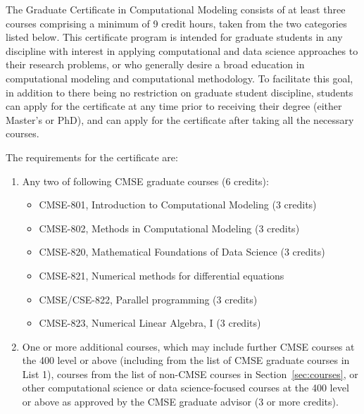 The Graduate Certificate in Computational Modeling consists of at least
three courses comprising a minimum of 9 credit hours, taken from the
two categories listed below.  This certificate program is intended for
graduate students in any discipline with interest in applying
computational and data science approaches to their research problems,
or who generally desire a broad education in computational modeling
and computational methodology.  To facilitate this goal, in addition
to there being no restriction on graduate student discipline, students
can apply for the certificate at any time prior to receiving their
degree (either Master’s or PhD), and can apply for the certificate
after taking all the necessary courses.  

\vspace{2mm}
\noindent
The requirements for the certificate are:

\begin{enumerate}
\item Any two of following CMSE graduate courses (6 credits):  

\begin{itemize}
    \item  CMSE-801, Introduction to Computational Modeling (3 credits)
    \item  CMSE-802, Methods in Computational Modeling (3 credits)  
    \item  CMSE-820, Mathematical Foundations of Data Science (3 credits)  
    \item  CMSE-821, Numerical methods for differential equations
    \item  CMSE/CSE-822, Parallel programming (3 credits) 
    \item  CMSE-823, Numerical Linear Algebra, I (3 credits)
\end{itemize}

\item One or more additional courses, which may include further CMSE
  courses at the 400 level or above (including from the list of 
  CMSE graduate courses in List 1), courses from the list of non-CMSE
  courses  in Section~\ref{sec:courses}, or other computational
  science or data science-focused courses at the 400 level or above as
  approved by the CMSE graduate advisor (3 or more credits).

\end{enumerate}

